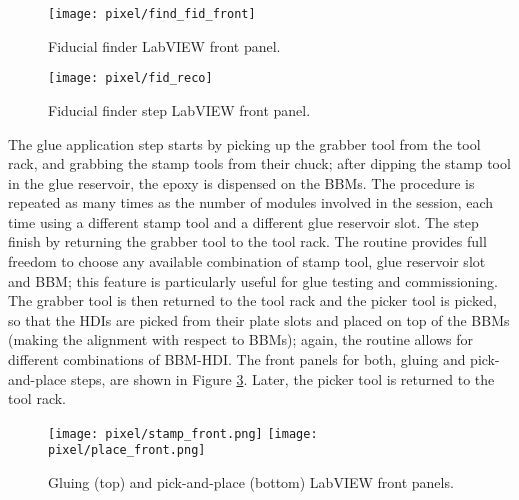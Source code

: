 \begin{landscape}
\begin{figure}[h]
\begin{center}
    \vspace{-2.9cm}
    \hspace{-1cm}
    \texttt{[image: pixel/find\_fid\_front]}
    \caption[Fiducial finder LabVIEW front panel]{Fiducial finder LabVIEW front panel.}\label{fig:find_fid_front}
    \vspace{-2cm}
    \hspace{-2cm}
\end{center}
\end{figure}
\end{landscape}


\begin{figure}[h]
\begin{center}
 \texttt{[image: pixel/fid\_reco]}
 \caption[Fiducial finder step LabVIEW front panel]{Fiducial finder step LabVIEW front panel.}\label{fig:fid_reco}
\end{center}
\end{figure}

The glue application step starts by picking up the grabber tool from the tool rack, and grabbing the stamp tools from their chuck; after dipping the stamp tool in the glue reservoir, the epoxy is dispensed on the BBMs. The procedure is repeated as many times as the number of modules involved in the session, each time using a different stamp tool and a different glue reservoir slot. The step finish by returning the grabber tool to the tool rack. The routine provides full freedom to choose any available combination of stamp tool, glue reservoir slot and BBM; this feature is particularly useful for glue testing and commissioning. The grabber tool is then returned to the tool rack and the picker tool is picked, so that the HDIs are picked from their plate slots and placed on top of the BBMs (making the alignment with respect to BBMs); again, the routine allows for different combinations of BBM-HDI. The front panels for both, gluing and pick-and-place steps, are shown in Figure \ref{fig:stamp_place_front}. Later, the picker tool is returned to the tool rack.

\begin{figure}[h]
\begin{center}
  \texttt{[image: pixel/stamp\_front.png]}
  \texttt{[image: pixel/place\_front.png]}
 \caption[Gluing and pick-and-place LabVIEW front panels]{Gluing (top) and pick-and-place (bottom) LabVIEW front panels.}\label{fig:stamp_place_front}
\end{center}
\end{figure}

